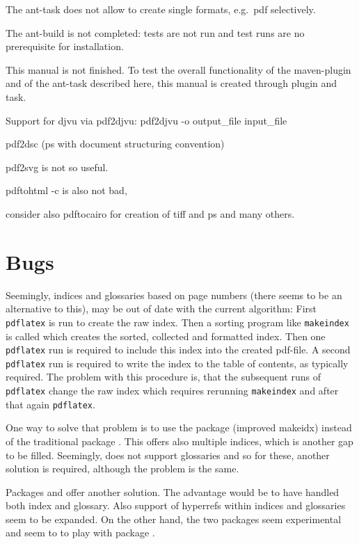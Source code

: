 \documentclass[12pt]{book}
\begin{document}
The ant-task does not allow to create single formats, e.g.~pdf selectively. 

The ant-build is not completed: tests are not run and 
test runs are no prerequisite for installation. 

This manual is not finished. 
To test the overall functionality of the maven-plugin and of the ant-task 
described here, this manual is created through plugin and task. 

Support for djvu via pdf2djvu: 
pdf2djvu -o output\_file input\_file

pdf2dsc
(ps with document structuring convention) 

pdf2svg is not so useful. 

pdftohtml -c is also not bad, 

consider also pdftocairo for creation of tiff and ps and many others. 

\chapter{Bugs}\label{chap:bugs}

Seemingly, indices and glossaries based on page numbers 
(there seems to be an alternative to this), 
may be out of date with the current algorithm: 
First \texttt{pdflatex} is run to create the raw index. 
Then a sorting program like \texttt{makeindex} is called 
which creates the sorted, collected and formatted index. 
Then one \texttt{pdflatex} run is required to include this index 
into the created pdf-file. 
A second \texttt{pdflatex} run is required 
to write the index to the table of contents, as typically required. 
The problem with this procedure is, 
that the subsequent runs of \texttt{pdflatex} change the raw index 
which requires rerunning \texttt{makeindex} 
and after that again \texttt{pdflatex}. 

One way to solve that problem is to use the package  
(improved makeidx) instead of the traditional package . 
This offers also multiple indices, which is another gap to be filled. 
Seemingly,  does not support glossaries 
and so for these, another solution is required, 
although the problem is the same. 

Packages  and  
offer another solution. 
The advantage would be to have handled both index and glossary. 
Also support of hyperrefs within indices and glossaries seem to be expanded. 
On the other hand, the two packages seem experimental 
and seem to to play with package . 
\end{document}
